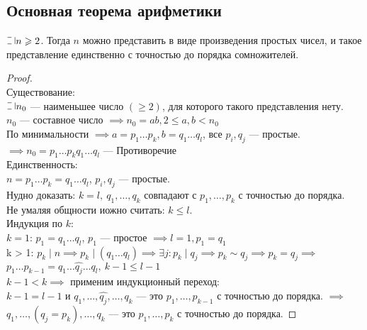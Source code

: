 \begin{normalsize}

\section{Основная теорема арифметики}

\begin{theorem}
    $\letus n \geq 2$. Тогда $n$ можно представить в виде произведения простых чисел, и такое представление единственно с точностью до порядка сомножителей.    
\end{theorem}

\begin{proof}\\
    Существование:\\
    $\letus n_0$ --- наименьшее число $(\geq 2)$, для которого такого представления нету.\\
    $n_0$ --- составное число $\implies n_0 = ab, 2 \leq a, b < n_0$\\
    По минимальности $\implies a = p_1 \ldots p_k, b = q_1 \ldots q_l$, все $p_i, q_j$ --- простые.\\
    $\implies n_0 = p_1 \ldots p_k q_1 \ldots q_l$ --- Противоречие\\
    Единственность:\\
    $n = p_1 \ldots p_k = q_1 \ldots q_l$, $p_i, q_j$ --- простые.\\
    Нудно доказать: $k = l,~q_1, \ldots, q_k$ совпадают с $p_1, \ldots, p_k$ с точностью до порядка.\\
    Не умаляя общности иожно считать: $k \leq l$. \\
    Индукция по $k$:\\
    $k = 1$: $p_1 = q_1 \ldots q_l$, $p_1$ --- простое $\implies l = 1, p_1 = q_1$\\
    k > 1: $p_k \mid n \implies p_k \mid (q_1 \ldots q_l) \implies \exists j : p_k \mid q_j \implies p_k \sim q_j \implies p_k = q_j \implies$\\
    $p_1 \ldots p_{k-1} = q_1 \ldots \hat{q_j} \ldots q_l,~k-1 \leq l-1$\\
    $k-1 < k \implies$ применим индукционный переход:\\
    $k-1 = l-1$ и $q_1, \ldots, \hat{q_j}, \ldots, q_k$ --- это $p_1, \ldots, p_{k-1}$ с точностью до порядка. $\implies$\\
    $q_1, \ldots, (q_j = p_k), \ldots, q_k$ --- это $p_1, \ldots, p_k$ с точностью до порядка.
\end{proof}


\end{normalsize}
